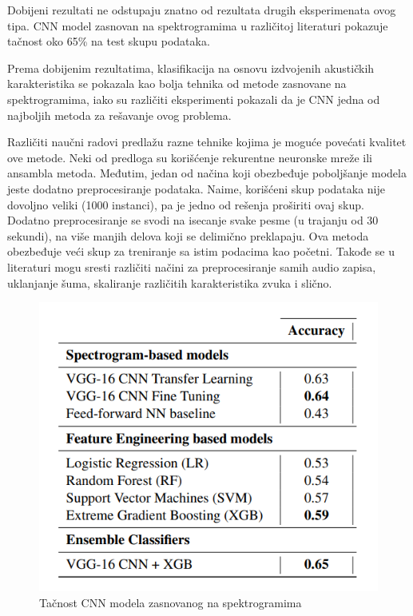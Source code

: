 \documentclass{article}
\begin{document}
Dobijeni rezultati ne odstupaju znatno od rezultata drugih eksperimenata ovog tipa. CNN model zasnovan na spektrogramima u različitoj literaturi pokazuje tačnost oko 65\% na test skupu podataka. 

Prema dobijenim rezultatima, klasifikacija na osnovu izdvojenih akustičkih karakteristika se pokazala kao bolja tehnika od metode zasnovane na spektrogramima, iako su različiti eksperimenti pokazali da je CNN jedna od najboljih metoda za rešavanje ovog problema.

Različiti naučni radovi predlažu razne tehnike kojima je moguće povećati kvalitet ove metode. Neki od predloga su korišćenje rekurentne neuronske mreže ili ansambla metoda. Međutim, jedan od načina koji obezbeđuje poboljšanje modela jeste dodatno preprocesiranje podataka. Naime, korišćeni skup podataka nije dovoljno veliki (1000 instanci), pa je jedno od rešenja proširiti ovaj skup. Dodatno preprocesiranje se svodi na isecanje svake pesme (u trajanju od 30 sekundi), na više manjih delova koji se delimično preklapaju. Ova metoda obezbeđuje veći skup za treniranje sa istim podacima kao početni. Takođe se u literaturi mogu sresti različiti načini za preprocesiranje samih audio zapisa, uklanjanje šuma, skaliranje različitih karakteristika zvuka i slično.

\begin{figure}[h]
\centering
\includegraphics[scale=0.8]{acc}
\caption{Tačnost CNN modela zasnovanog na spektrogramima}
\end{figure}
\end{document}
